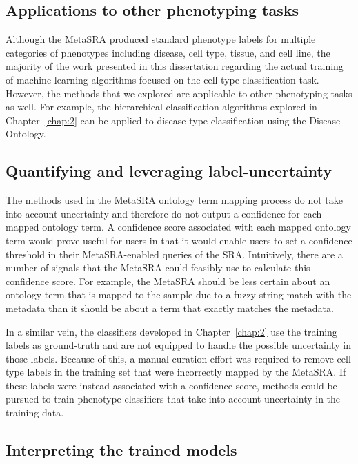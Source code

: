 \subsection{Applications to other phenotyping tasks}

Although the MetaSRA produced standard phenotype labels for multiple categories of phenotypes including disease, cell type, tissue, and cell line, the majority of the work presented in this dissertation regarding the actual training of machine learning algorithms focused on the cell type classification task. However, the methods that we explored are applicable to other phenotyping tasks as well. For example, the hierarchical classification algorithms explored in Chapter~\ref{chap:2} can be applied to disease type classification using the Disease Ontology. 

\subsection{Quantifying and leveraging label-uncertainty}

The methods used in the MetaSRA ontology term mapping process do not take into account uncertainty and therefore do not output a confidence for each mapped ontology term.  A confidence score associated with each mapped ontology term would prove useful for users in that it would enable users to set a confidence threshold in their MetaSRA-enabled queries of the SRA.  Intuitively, there are a number of signals that the MetaSRA could feasibly use to calculate this confidence score. For example, the MetaSRA should be less certain about an ontology term that is mapped to the sample due to a fuzzy string match with the metadata than it should be about a term that exactly matches the metadata.  

In a similar vein, the classifiers developed in Chapter~\ref{chap:2} use the training labels as ground-truth and are not equipped to handle the possible uncertainty in those labels.  Because of this, a manual curation effort was required to remove cell type labels in the training set that were incorrectly mapped by the MetaSRA. If these labels were instead associated with a confidence score, methods could be pursued to train phenotype classifiers that take into account uncertainty in the training data. 

\subsection{Interpreting the trained models}


